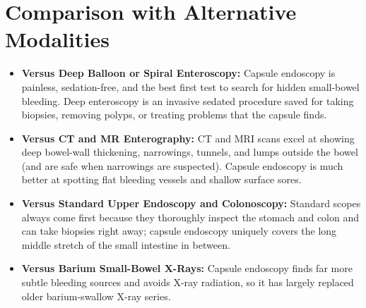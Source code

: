 \section{Comparison with Alternative Modalities}
\begin{itemize}
    \item \textbf{Versus Deep Balloon or Spiral Enteroscopy:} Capsule endoscopy is painless, sedation-free, and the best first test to search for hidden small-bowel bleeding. Deep enteroscopy is an invasive sedated procedure saved for taking biopsies, removing polyps, or treating problems that the capsule finds.
    \item \textbf{Versus CT and MR Enterography:} CT and MRI scans excel at showing deep bowel-wall thickening, narrowings, tunnels, and lumps outside the bowel (and are safe when narrowings are suspected). Capsule endoscopy is much better at spotting flat bleeding vessels and shallow surface sores.
    \item \textbf{Versus Standard Upper Endoscopy and Colonoscopy:} Standard scopes always come first because they thoroughly inspect the stomach and colon and can take biopsies right away; capsule endoscopy uniquely covers the long middle stretch of the small intestine in between.
    \item \textbf{Versus Barium Small-Bowel X-Rays:} Capsule endoscopy finds far more subtle bleeding sources and avoids X-ray radiation, so it has largely replaced older barium-swallow X-ray series.
\end{itemize}

